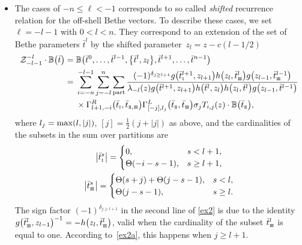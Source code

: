 \documentclass[10pt,a4paper]{amsart}
\newcommand{\so}{\scriptscriptstyle \rm I}
\newcommand{\st}{\scriptscriptstyle \rm I\hspace{-1pt}I}
\newcommand{\sth}{\scriptscriptstyle \rm I\hspace{-1pt}I\hspace{-1pt}I}
\newcommand{\bt}{{\bar t}}
\theoremstyle{definition}
\def\BB{{\mathbb{B}}}
\def\r#1{\eqref{#1}}
\def\Z{\mathcal{Z}}
\def\Gml{\Gamma^L}
\def\Gmr{\Gamma^R}
\begin{document}
\begin{itemize}
which coincides with the
recurrence relation (3.16) from the paper \cite{LP2}.
\item The cases of $-n\leq \ell<-1$ corresponds to so called {\it shifted}
 recurrence
relation for the off-shell Bethe vectors.
To describe these cases, we set
$\ell=-l-1$ with $0<l<n$. They correspond to an extension of the set of Bethe
parameters $\bt^l$ by the shifted parameter~${z_l=z-c(l-1/2)}$
\begin{align}
\Z^{-l}_{-l-1}\cdot\BB\bigl(\bt\bigr)={}&
\BB\bigl(\bt^0,\dots,\bt^{l-1},\bigl\{\bt^{l},z_{l}\bigr\},\bt^{l+1},\dots,\bt^{n-1}\bigr)\nonumber\\
={}&\sum_{i=-n}^{-l-1}\sum_{j=-l}^n\sum_{\rm part}
\frac{(-1)^{\delta_{j\geq l+1}}
g\bigl(\bt^{l+1}_{\so},z_{l+1}\bigr) h\bigl(z_l,\bt^{l}_{\sth}\bigr) g\bigl(z_{l-1},\bt^{l-1}_{\sth}\bigr)}
{\lambda_{-l}(z) g\bigl(\bt^{l+1},z_{l+1}\bigr) h\bigl(\bt^{l},z_{l}\bigr) h\bigl(z_l,\bt^{l}\bigr)
g\bigl(z_{l-1},\bt^{l-1}\bigr)}\nonumber\\
&\times \Gmr_{l+1,-i}\bigl(\bt_{\so},\bt_{{\st},{\sth}}\bigr)
\Gml_{[-j],l_j}\bigl(\bt_{\st},\bt_{{\sth}}\bigr)\sigma_{j}
T_{i,j}(z)\cdot \BB\bigl(\bt_{\st}\bigr) ,\label{ex2}
\end{align}
where $l_j={\rm max}(l,|j|)$, $[j]=\frac12(j+|j|)$ as above, and the
 cardinalities of the subsets in the sum over partitions are
\begin{gather}
\big|\bt^s_{\so}\big|=\begin{cases}
0, &s<l+1,\\
\Theta(-i-s-1), &s\geq l+1,
\end{cases}\nonumber\\
\big|\bt^s_{\sth}\big|=\begin{cases}
\Theta(s+j)+\Theta(j-s-1), &s<l,\\
\Theta(j-s-1), &s\geq l.
\end{cases}\label{ex2a}
\end{gather}
The sign factor $(-1)^{\delta_{j\geq l+1}}$ in the second line of
\r{ex2} is due to the identity
 $g\bigl(\bt^l_{\sth},z_{l-1}\bigr)^{-1}=-h\bigl(z_{l},\bt^l_{\sth}\bigr)$, valid when the cardinality of the subset
$\bt^l_{\sth}$ is equal to one. According to~\r{ex2a}, this happens
when $j\geq l+1$.


\end{itemize}
\end{document}
